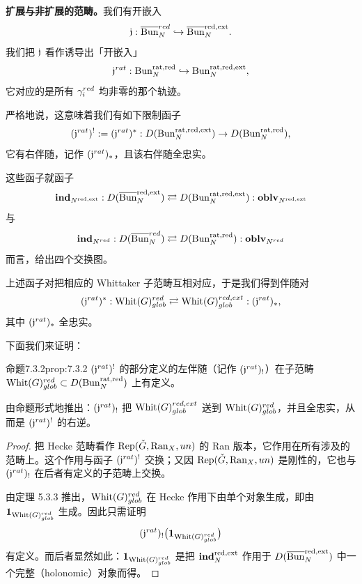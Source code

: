 \textbf{扩展与非扩展的范畴。}我们有开嵌入
\[
  \mathfrak{j} : \overline{\operatorname{Bun}}^{red}_N\hookrightarrow\overline{\operatorname{Bun}}^{\mathrm{red},\mathrm{ext}}_N .
\]
我们把 $\mathfrak{j}$ 看作诱导出「开嵌入」
\[
  \mathfrak{j}^{rat} : \operatorname{Bun}^{\mathrm{rat},\mathrm{red}}_N\hookrightarrow\operatorname{Bun}^{\mathrm{rat},\mathrm{red},\mathrm{ext}}_N,
\]
它对应的是所有 $\gamma_i^{red}$ 均非零的那个轨迹。

严格地说，这意味着我们有如下限制函子
\[
  (\mathfrak{j}^{rat})^! := (\mathfrak{j}^{rat})^* :
  D(\operatorname{Bun}^{\mathrm{rat},\mathrm{red},\mathrm{ext}}_N)\to D(\operatorname{Bun}^{\mathrm{rat},\mathrm{red}}_N),
\]
它有右伴随，记作 $(\mathfrak{j}^{rat})_*$，且该右伴随全忠实。

这些函子就函子
\[
  \mathbf{ind}_{N^{\mathrm{red},\mathrm{ext}}} : D(\overline{\operatorname{Bun}}^{\mathrm{red},\mathrm{ext}}_N)
  \rightleftarrows D(\operatorname{Bun}^{\mathrm{rat},\mathrm{red},\mathrm{ext}}_N) : \mathbf{oblv}_{N^{\mathrm{red},\mathrm{ext}}}
\]
与
\[
  \mathbf{ind}_{N^{red}} : D(\overline{\operatorname{Bun}}^{red}_N)
  \rightleftarrows D(\operatorname{Bun}^{\mathrm{rat},\mathrm{red}}_N) : \mathbf{oblv}_{N^{red}}
\]
而言，给出四个交换图。

上述函子对把相应的 Whittaker 子范畴互相对应，于是我们得到伴随对
\[
  (\mathfrak{j}^{rat})^* : \mathrm{Whit}(G)^{red}_{glob}\rightleftarrows\mathrm{Whit}(G)^{red,ext}_{glob} : (\mathfrak{j}^{rat})_*,
\]
其中 $(\mathfrak{j}^{rat})_*$ 全忠实。

下面我们来证明：

\begin{othm}{命题}{7.3.2}{prop:7.3.2}
$(\mathfrak{j}^{rat})^!$ 的部分定义的左伴随（记作 $(\mathfrak{j}^{rat})_!$）在子范畴 $\mathrm{Whit}(G)^{red}_{glob}\subset D(\operatorname{Bun}^{\mathrm{rat},\mathrm{red}}_N)$ 上有定义。
\end{othm}

由命题形式地推出：$(\mathfrak{j}^{rat})_!$ 把 $\mathrm{Whit}(G)^{red,ext}_{glob}$ 送到 $\mathrm{Whit}(G)^{red}_{glob}$，并且全忠实，从而是 $(\mathfrak{j}^{rat})^!$ 的右逆。

\begin{proof}
把 Hecke 范畴看作 $\operatorname{Rep}(\check G,\mathrm{Ran}_X,un)$ 的 Ran 版本，它作用在所有涉及的范畴上。这个作用与函子 $(\mathfrak{j}^{rat})^!$ 交换；又因 $\operatorname{Rep}(\check G,\mathrm{Ran}_X,un)$ 是刚性的，它也与 $(\mathfrak{j}^{rat})_!$ 在后者有定义的子范畴上交换。

由定理 5.3.3 推出，$\mathrm{Whit}(G)^{red}_{glob}$ 在 Hecke 作用下由单个对象生成，即由 $\mathbf{1}_{\mathrm{Whit}(G)^{red}_{glob}}$ 生成。因此只需证明
\[
  (\mathfrak{j}^{rat})_!\bigl(\mathbf{1}_{\mathrm{Whit}(G)^{red}_{glob}}\bigr)
\]
有定义。而后者显然如此：$\mathbf{1}_{\mathrm{Whit}(G)^{red}_{glob}}$ 是把 $\mathbf{ind}_N^{\mathrm{red},\mathrm{ext}}$ 作用于 $D(\overline{\operatorname{Bun}}^{\mathrm{red},\mathrm{ext}}_N)$ 中一个完整（holonomic）对象而得。
\end{proof}


